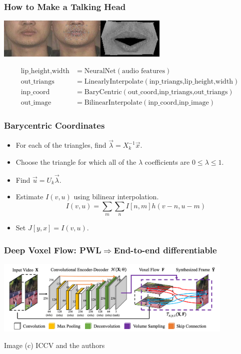 \documentclass{beamer}
\begin{document}
\begin{frame}
  \frametitle{How to Make a Talking Head}
  \centerline{\includegraphics[height=0.75in]{mp7_image_warping_points.jpg}\includegraphics[height=0.75in]{mp7_image_warped.jpg}}
  \begin{align*}
    \mbox{lip\_height,width} &= \mbox{NeuralNet}\left(\mbox{audio features}\right)\\
    \mbox{out\_triangs} &= \mbox{LinearlyInterpolate}\left(\mbox{inp\_triangs,lip\_height,width}\right)\\
    \mbox{inp\_coord} &= \mbox{BaryCentric}\left(\mbox{out\_coord,inp\_triangs,out\_triangs}\right)\\
    \mbox{out\_image} &= \mbox{BilinearInterpolate}\left(\mbox{inp\_coord,inp\_image}\right)
  \end{align*}
\end{frame}

\begin{frame}
  \frametitle{Barycentric Coordinates}

  \begin{itemize}
  \item For each of the triangles, find $\vec\lambda=X_k^{-1}\vec{x}$.
  \item Choose the triangle for which all of the $\lambda$ coefficients
    are $0\le\lambda\le 1$.
  \item Find $\vec{u}=U_k\vec\lambda$.
  \item Estimate $I(v,u)$ using bilinear interpolation.
    \[
    I(v,u) = \sum_m\sum_n I[n,m] h(v-n,u-m)
    \]    
  \item Set $J[y,x]=I(v,u)$.
  \end{itemize}
\end{frame}

\begin{frame}
  \frametitle{Deep Voxel Flow: PWL$\Rightarrow$End-to-end differentiable}

  \centerline{\includegraphics[width=4.5in]{figs/liu17iccv1.png}}
  \begin{small}Image (c) ICCV and the authors\end{small}
\end{frame}
\end{document}
